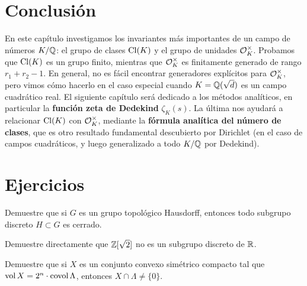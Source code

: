 

\section*{Conclusión}

En este capítulo investigamos los invariantes más importantes de un campo de
números $K/\mathbb{Q}$: el grupo de clases $\operatorname{Cl} (K)$ y el grupo de unidades
$\mathcal{O}_K^\times$. Probamos que $\operatorname{Cl} (K)$ es un grupo finito, mientras que
$\mathcal{O}_K^\times$ es finitamente generado de rango $r_1 + r_2 - 1$. En general,
no es fácil encontrar generadores explícitos para $\mathcal{O}_K^\times$, pero vimos cómo
hacerlo en el caso especial cuando $K = \mathbb{Q} (\sqrt{d})$ es un campo cuadrático
real. El siguiente capítulo será dedicado a los métodos analíticos,
en particular la \textbf{función zeta de Dedekind} $\zeta_K (s)$. La última
nos ayudará a relacionar $\operatorname{Cl} (K)$ con $\mathcal{O}_K^\times$, mediante la
\textbf{fórmula analítica del número de clases}, que es otro resultado
fundamental descubierto por Dirichlet (en el caso de campos cuadráticos,
y luego generalizado a todo $K/\mathbb{Q}$ por Dedekind).


\pagebreak


\section*{Ejercicios}

\begin{ejercicio}
  Demuestre que si $G$ es un grupo topológico Hausdorff, entonces todo subgrupo
  discreto $H \subset G$ es cerrado.
\end{ejercicio}

\begin{ejercicio}
  Demuestre directamente que $\mathbb{Z} [\sqrt{2}]$ no es un subgrupo discreto de
  $\mathbb{R}$.
\end{ejercicio}

\begin{ejercicio}
  Demuestre que si $X$ es un conjunto convexo simétrico compacto tal que
  $\operatorname{vol} X = 2^n\cdot \operatorname{covol} \Lambda$, entonces $X \cap \Lambda \ne \{ 0 \}$.
\end{ejercicio}

